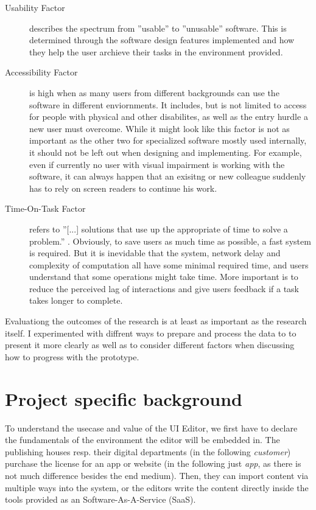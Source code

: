 \begin{description}
  \item[Usability Factor] describes the spectrum from ''usable'' to ''unusable'' software. This is determined through the software design features implemented and how they help the user archieve their tasks in the environment provided.
  \item[Accessibility Factor] is high when as many users from different backgrounds can use the software in different enviornments. It includes, but is not limited to access for people with physical and other disabilites, as well as the entry hurdle a new user must overcome.
While it might look like this factor is not as important as the other two for specialized software mostly used internally, it should not be left out when designing and implementing. For example, even if currently no user with visual impairment is working with the software, it can always happen that an exisitng or new colleague suddenly has to rely on screen readers to continue his work.
  \item[Time-On-Task Factor] refers to ''[...] solutions that use up the appropriate of time to solve a problem.'' \Cite[p. 40]{LearnHCI:2020ys}. Obviously, to save users as much time as possible, a fast system is required.
But it is inevidable that the system, network delay and complexity of computation all have some minimal required time, and users understand that some operations might take time. More important is to reduce the perceived lag of interactions and give users feedback if a task takes longer to complete.
\end{description}
Evaluationg the outcomes of the research is at least as important as the research itself.
I experimented with diffrent ways to prepare and process the data to to present it more clearly as well as to consider different factors when discussing how to progress with the prototype.

\section{Project specific background}
To understand the usecase and value of the UI Editor, we first have to declare the fundamentals of the environment the editor will be embedded in.
The publishing houses resp. their digital departments (in the following \textit{customer}) purchase the license for an app or website (in the following just \textit{app}, as there is not much difference besides the end medium).
Then, they can import content via multiple ways into the system, or the editors write the content directly inside the tools provided as an Software-As-A-Service (SaaS).

